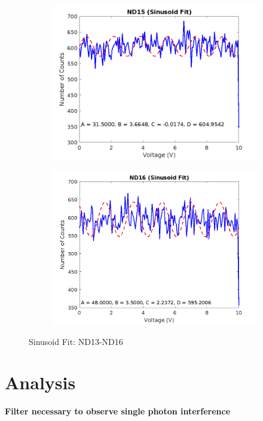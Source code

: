 \documentclass{article}
\numberwithin{equation}{section}
\begin{document}
\begin{figure}[h]
\begin{subfigure}[b]{0.45\textwidth}
        \includegraphics[width=\textwidth]{ND15_sinusoid_fit.png}
    \end{subfigure}
    \hfill
    \begin{subfigure}[b]{0.45\textwidth}
        \includegraphics[width=\textwidth]{ND16_sinusoid_fit.png}
    \end{subfigure}
    \caption{Sinusoid Fit: ND13-ND16}
    \label{fig:ND13-ND16}
\end{figure}


\section{Analysis}

\textbf{Filter necessary to observe single photon interference}
\end{document}
